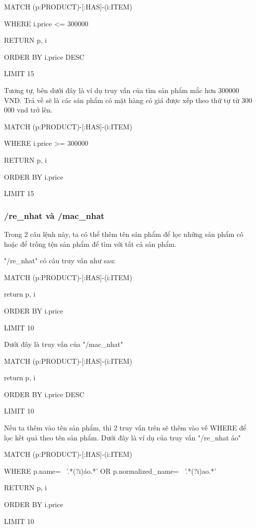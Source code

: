 MATCH (p:PRODUCT)-[:HAS]-(i:ITEM)

WHERE i.price <= 300000 

RETURN p, i 

ORDER BY i.price DESC 

LIMIT 15

\smallskip

Tương tự, bên dưới đây là ví dụ truy vấn của tìm sản phẩm mắc hơn 300000 VND. Trả về sẽ là các sản phẩm có mặt hàng có giá được xếp theo thứ tự từ 300 000 vnd trở lên. 

MATCH (p:PRODUCT)-[:HAS]-(i:ITEM)

WHERE i.price >= 300000 

RETURN p, i 

ORDER BY i.price  

LIMIT 15

\smallskip

\subsubsection{/re\_nhat và /mac\_nhat }

Trong 2 câu lệnh này, ta có thể thêm tên sản phẩm để lọc những sản phẩm có hoặc để trống tện sản phẩm để tìm với tất cả sản phẩm. 

"/re\_nhat" có câu truy vấn như sau: 

MATCH (p:PRODUCT)-[:HAS]-(i:ITEM)

return p, i 

ORDER BY i.price  

LIMIT 10

\smallskip

Dưới đây là truy vấn của "/mac\_nhat" 

MATCH (p:PRODUCT)-[:HAS]-(i:ITEM)

return p, i 

ORDER BY i.price DESC 

LIMIT 10

\smallskip

Nếu ta thêm vào tên sản phẩm, thì 2 truy vấn trên sẽ thêm vào vế WHERE để lọc kết quả theo tên sản phẩm. Dưới đây là ví dụ của truy vấn "/re\_nhat áo" 

MATCH (p:PRODUCT)-[:HAS]-(i:ITEM)

WHERE p.name=~ '.*(?i)áo.*' OR p.normalized\_name=~ '.*(?i)ao.*' 

RETURN p, i 

ORDER BY i.price  

LIMIT 10

